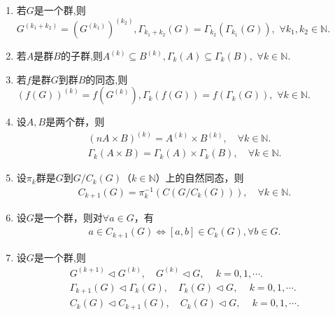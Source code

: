 \documentclass[../../main.tex]{subfiles}%
\begin{document}
\begin{proposition}\label{proposition:导出列的基本性质--抽象代数}
\begin{enumerate}[(1)]
\item\label{proposition:导出列的基本性质--抽象代数-1} 若$G$是一个群,则$G^{(k_1+k_2)}=(G^{(k_1)})^{(k_2)},\Gamma _{k_1+k_2}\left( G \right) =\Gamma _{k_2}\left( \Gamma _{k_1}\left( G \right) \right) ,\,\,\forall k_1,k_2\in \mathbb{N}.$

\item\label{proposition:导出列的基本性质--抽象代数-2} 若$A$是群$B$的子群,则$A^{(k)}\subseteq B^{(k)},\Gamma _k\left( A \right) \subseteq \Gamma _k\left( B \right) ,\,\,\forall k\in \mathbb{N}.$

\item\label{proposition:导出列的基本性质--抽象代数-3} 若$f$是群$G$到群$B$的同态,则$(f(G))^{(k)}=f(G^{(k)}),\Gamma_k(f(G)) = f(\Gamma_k(G)),\,\,\forall k\in \mathbb{N}.$

\item\label{proposition:导出列的基本性质--抽象代数-4} 设$A,B$是两个群，则
\begin{gather*}
\left( nA\times B \right) ^{\left( k \right)}=A^{\left( k \right)}\times B^{\left( k \right)},\quad \forall k\in \mathbb{N}.
\\
\Gamma _k\left( A\times B \right) =\Gamma _k\left( A \right) \times \Gamma _k\left( B \right),\quad \forall k\in \mathbb{N}.
\end{gather*}

\item\label{proposition:导出列的基本性质--抽象代数-5} 设$\pi_k$群是$G$到$G/C_k(G)$（$k\in \mathbb{N}$）上的自然同态，则
\begin{align*}
C_{k+1}(G) = \pi_k^{-1}\left(C\left(G/C_k(G)\right)\right),\quad \forall k\in \mathbb{N}.
\end{align*}

\item\label{proposition:导出列的基本性质--抽象代数-6} 设$G$是一个群，则对$\forall a\in G$，有
\begin{align*}
a\in C_{k+1}(G) \Longleftrightarrow [a,b] \in C_k(G),\forall b\in G.
\end{align*}

\item\label{proposition:导出列的基本性质--抽象代数-7} 设$G$是一个群,则
\begin{gather*}
G^{\left( k+1 \right)}\lhd G^{\left( k \right)},\quad G^{\left( k \right)}\lhd G,\,\quad k=0,1,\cdots .
\\
\Gamma _{k+1}\left( G \right) \lhd \Gamma _k\left( G \right) ,\quad \Gamma _k\left( G \right) \lhd G,\,\quad k=0,1,\cdots .
\\
C_k\left( G \right) \lhd C_{k+1}\left( G \right) ,\quad C_k\left( G \right) \lhd G,\,\quad k=0,1,\cdots .
\end{gather*}
\end{enumerate}
\end{proposition}
\end{document}
